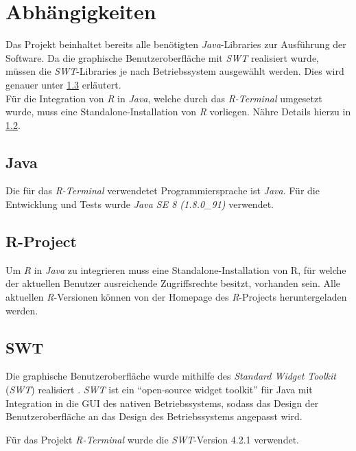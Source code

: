 \documentclass[a4paper, 12pt]{report} %
\begin{document}
\section{Abhängigkeiten} \label{Abhängigkeiten}

Das Projekt beinhaltet bereits alle benötigten \textit{Java}-Libraries zur Ausführung der Software. 
Da die graphische Benutzeroberfläche mit \textit{SWT} realisiert wurde, müssen die \textit{SWT}-Libraries je nach Betriebssystem ausgewählt werden. Dies wird genauer unter \ref{swt} erläutert.\\

Für die Integration von \textit{R} in \textit{Java}, welche durch das \textit{R-Terminal} umgesetzt wurde, muss eine Standalone-Installation von \textit{R} vorliegen. Nähre Details hierzu in \ref{r}.
 
\subsection{Java}

Die für das \textit{R-Terminal} verwendetet Programmiersprache ist \textit{Java}. Für die Entwicklung und Tests wurde \textit{Java SE 8 (1.8.0\_91)} verwendet. \cite{java}
 
\subsection{R-Project} \label{r}

Um \textit{R} in \textit{Java} zu integrieren muss eine Standalone-Installation von R, für welche der aktuellen Benutzer ausreichende Zugriffsrechte besitzt, vorhanden sein. 
Alle aktuellen \textit{R}-Versionen können von der Homepage des \textit{R}-Projects \cite{rproject} heruntergeladen werden. 


\subsection{SWT}\label{swt} 
Die graphische Benutzeroberfläche wurde mithilfe des \textit{Standard Widget Toolkit} (\textit{SWT}) realisiert \cite{swt}. \textit{SWT} ist ein "`open-source widget toolkit"' für Java mit Integration in die GUI des nativen Betriebssystems, sodass das Design der Benutzeroberfläche an das Design des Betriebssystems angepasst wird. 

Für das Projekt \textit{R-Terminal} wurde die \textit{SWT}-Version 4.2.1 verwendet.\\
\end{document}
